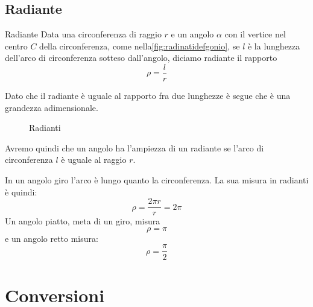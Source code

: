 \subsection{Radiante}
\begin{definizionet}{Radiante}{}
	Data una circonferenza di raggio $r$ e un angolo $\alpha$ con il vertice nel centro $C$ della circonferenza, come nella\nobs\vref{fig:radinatidefgonio}, se $l$ è la lunghezza dell'arco di circonferenza sotteso dall'angolo, diciamo radiante il rapporto \[\rho=\dfrac{l}{r} \]
\end{definizionet}
Dato che il radiante è uguale al rapporto fra due lunghezze è segue che è una grandezza adimensionale.
\begin{figure}
	\centering
	
	\caption{Radianti}
	\label{fig:radinatidefgonio}
\end{figure}
Avremo quindi che un angolo ha l'ampiezza di un radiante se l'arco di circonferenza $l$ è uguale al raggio $r$.

In un angolo giro l'arco è lungo quanto la circonferenza. La sua misura in radianti è quindi:\[\rho=\dfrac{2\pi r}{r}=2\pi\]
Un angolo piatto, meta di un giro, misura \[\rho=\pi\] e un angolo
retto misura: \[\rho=\dfrac{\pi}{2} \] 
\section{Conversioni}
